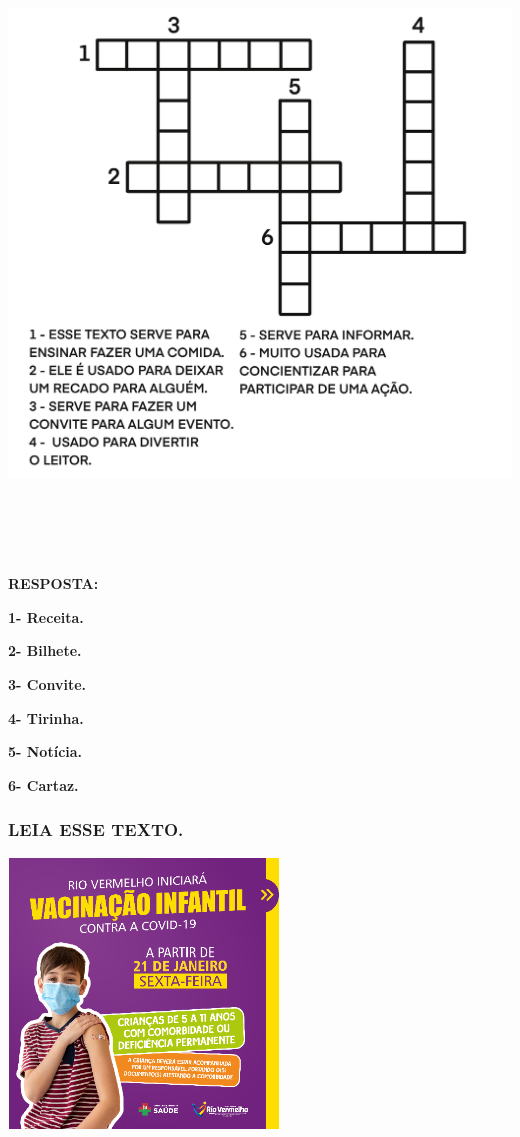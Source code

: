 \includegraphics[width=5.80417in,height=6.50556in]{media/image155.png}

\protect\hypertarget{_heading=h.vv31p5wq2469}{}{}

\textbf{RESPOSTA:}

\textbf{1- Receita.}

\textbf{2- Bilhete.}

\textbf{3- Convite.}

\textbf{4- Tirinha.}

\textbf{5- Notícia.}

\textbf{6- Cartaz.}

\subsubsection{LEIA ESSE TEXTO.}\label{leia-esse-texto.}

\includegraphics[width=2.82569in,height=2.82569in]{media/image156.png}

